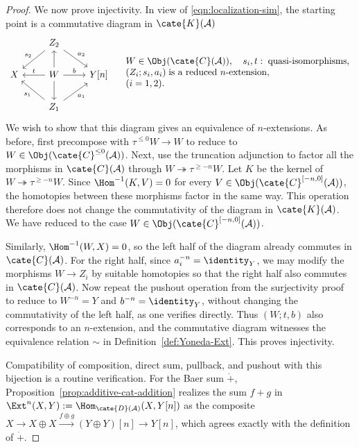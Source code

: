 \begin{proof}
	We now prove injectivity. In view of \eqref{eqn:localization-sim}, the
	starting point is a commutative diagram in $\cate{K}(\mathcal{A})$
	{\scriptsize
	\[\begin{tikzcd}
		& Z_2 \arrow[ld, "s_2"'] \arrow[rd, "a_2"] & \\
		X & W \arrow[l, "t"'] \arrow[r, "b"] \arrow[u] \arrow[d] & Y[n] \\
		& Z_1 \arrow[lu, "s_1"] \arrow[ru, "a_1"'] &
	\end{tikzcd} \quad \begin{array}{l}
		W \in \Obj(\cate{C}(\mathcal{A})), \quad s_i,t:\;\text{quasi-isomorphisms}, \\
		(Z_i;s_i,a_i)\;\text{is a reduced \(n\)-extension},\\
		(i=1,2).
	\end{array}\]
	}
	We wish to show that this diagram gives an equivalence of
	$n$-extensions. As before, first precompose with
	$\tau^{\leq0}W\to W$ to reduce to
	$W\in\Obj(\cate{C}^{\leq0}(\mathcal{A}))$. Next, use the truncation
	adjunction to factor all the morphisms in $\cate{C}(\mathcal{A})$
	through $W\twoheadrightarrow\tau^{\geq-n}W$. Let $K$ be the kernel of
	$W\twoheadrightarrow\tau^{\geq-n}W$. Since
	$\Hom^{-1}(K,V)=0$ for every
	$V\in\Obj(\cate{C}^{[-n,0]}(\mathcal{A}))$, the homotopies between
	these morphisms factor in the same way. This operation therefore does
	not change the commutativity of the diagram in
	$\cate{K}(\mathcal{A})$. We have reduced to the case
	$W\in\Obj(\cate{C}^{[-n,0]}(\mathcal{A}))$.

	Similarly, $\Hom^{-1}(W,X)=0$, so the left half of the diagram already
	commutes in $\cate{C}(\mathcal{A})$. For the right half, since
	$a_i^{-n}=\identity_Y$, we may modify the morphisms $W\to Z_i$ by
	suitable homotopies so that the right half also commutes in
	$\cate{C}(\mathcal{A})$. Now repeat the pushout operation from the
	surjectivity proof to reduce to $W^{-n}=Y$ and
	$b^{-n}=\identity_Y$, without changing the commutativity of the left
	half, as one verifies directly. Thus $(W;t,b)$ also corresponds to an
	$n$-extension, and the commutative diagram witnesses the equivalence
	relation $\sim$ in Definition~\ref{def:Yoneda-Ext}. This proves
	injectivity.

	Compatibility of composition, direct sum, pullback, and pushout with
	this bijection is a routine verification. For the Baer sum $\dot{+}$,
	Proposition~\ref{prop:additive-cat-addition} realizes the sum $f+g$ in
	$\Ext^n(X,Y):=\Hom_{\cate{D}(\mathcal{A})}(X,Y[n])$ as the composite
	$X\to X\oplus X\xrightarrow{f\oplus g}(Y\oplus Y)[n]\to Y[n]$,
	which agrees exactly with the definition of $\dot{+}$.
\end{proof}

